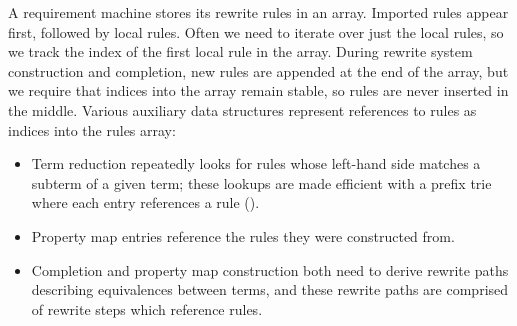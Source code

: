 \documentclass[../generics]{subfiles}
\begin{document}
%
%
A requirement machine stores its rewrite rules in an array. Imported rules appear first, followed by local rules. Often we need to iterate over just the local rules, so we track the index of the first local rule in the array. During rewrite system construction and completion, new rules are appended at the end of the array, but we require that indices into the array remain stable, so rules are never inserted in the middle. Various auxiliary data structures represent references to rules as indices into the rules array:
\begin{itemize}
\item Term reduction repeatedly looks for rules whose left-hand side matches a subterm of a given term; these lookups are made efficient with a prefix trie where each entry references a rule ().
\item Property map entries reference the rules they were constructed from.
\item Completion and property map construction both need to derive rewrite paths describing equivalences between terms, and these rewrite paths are comprised of rewrite steps which reference rules.
\end{itemize}

%
%
\end{document}
